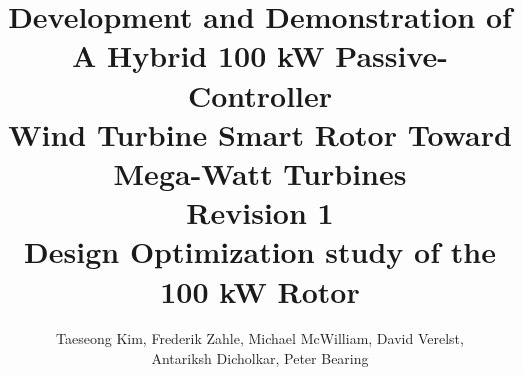 \documentclass[
oneside,
paper=a4,
fontsize=9pt,
parskip=half,        %
DIV=12,              %
BCOR=10mm,           %
headings=normal,
appendixprefix=true, %
]{scrbook}			%
\begin{document}
\title{
Development and Demonstration of A Hybrid 100 kW Passive-Controller\\
Wind Turbine Smart Rotor Toward Mega-Watt Turbines\\
Revision 1\\
\vspace{0.5cm}
\large Design Optimization study of the 100 kW Rotor
}
\vspace{0.5cm}
\author{Taeseong Kim, Frederik Zahle, Michael McWilliam, David Verelst, \\ Antariksh Dicholkar, Peter Bearing}

\maketitle


\tableofcontents



\clearpage

\clearpage

%
\clearpage






\end{document}
